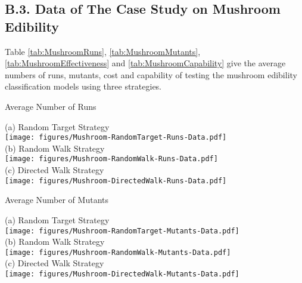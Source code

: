 \documentclass[preprint,1p,authoryear,times]{elsarticle}
\begin{document}
\newpage
\subsection*{B.3. Data of The Case Study on Mushroom Edibility}

Table \ref{tab:MushroomRuns}, \ref{tab:MushroomMutants}, \ref{tab:MushroomEffectiveness} and \ref{tab:MushroomCapability} give the average numbers of runs, mutants, cost and capability of testing the mushroom edibility classification models using three strategies.  

\begin{table}[htbp]
	\caption{Average Number of Runs}	\label{tab:MushroomRuns}
	\begin{center}
	\scriptsize{(a) Random Target Strategy}\\
	\texttt{[image: figures/Mushroom-RandomTarget-Runs-Data.pdf]}\\
	\scriptsize{(b) Random Walk Strategy}\\
	\texttt{[image: figures/Mushroom-RandomWalk-Runs-Data.pdf]}\\
		\scriptsize{(c) Directed Walk Strategy}\\
	\texttt{[image: figures/Mushroom-DirectedWalk-Runs-Data.pdf]}\\
	\end{center}
\end{table}

\begin{table}[htbp]
	\caption{Average Number of Mutants}	\label{tab:MushroomMutants}
	\begin{center}
	\scriptsize{(a) Random Target Strategy}\\
	\texttt{[image: figures/Mushroom-RandomTarget-Mutants-Data.pdf]}\\
	\scriptsize{(b) Random Walk Strategy}\\
	\texttt{[image: figures/Mushroom-RandomWalk-Mutants-Data.pdf]}\\
		\scriptsize{(c) Directed Walk Strategy}\\
	\texttt{[image: figures/Mushroom-DirectedWalk-Mutants-Data.pdf]}\\
	\end{center}
\end{table}
\end{document}
